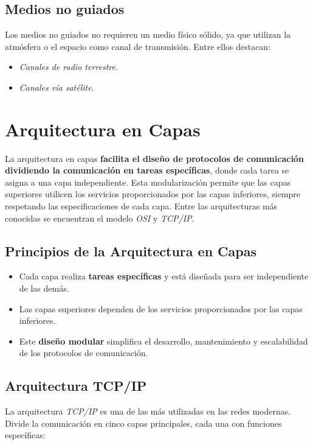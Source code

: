 \documentclass{article}
\begin{document}
\subsection{Medios no guiados}
Los medios no guiados no requieren un medio físico sólido, ya que utilizan la atmósfera o el espacio como canal de transmisión. Entre ellos destacan:
\begin{itemize}
    \item \textit{Canales de radio terrestre}.
    \item \textit{Canales vía satélite}.
\end{itemize}

\newpage

\section{Arquitectura en Capas}

La arquitectura en capas \textbf{facilita el diseño de protocolos de comunicación dividiendo la comunicación en tareas específicas}, donde cada tarea se asigna a una capa independiente. Esta modularización permite que las capas superiores utilicen los servicios proporcionados por las capas inferiores, siempre respetando las especificaciones de cada capa. Entre las arquitecturas más conocidas se encuentran el modelo \textit{OSI} y \textit{TCP/IP}.

\subsection{Principios de la Arquitectura en Capas}
\begin{itemize}
    \item Cada capa realiza \textbf{tareas específicas} y está diseñada para ser independiente de las demás.
    \item Las capas superiores dependen de los servicios proporcionados por las capas inferiores.
    \item Este \textbf{diseño modular} simplifica el desarrollo, mantenimiento y escalabilidad de los protocolos de comunicación.
\end{itemize}

\subsection{Arquitectura TCP/IP}
La arquitectura \textit{TCP/IP} es una de las más utilizadas en las redes modernas. Divide la comunicación en cinco capas principales, cada una con funciones específicas:
\end{document}
